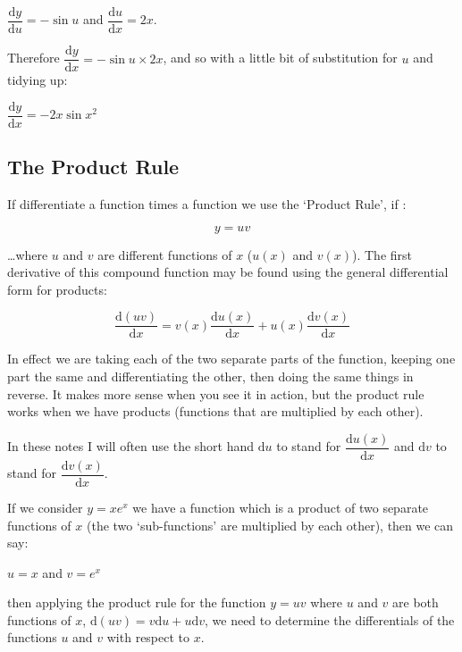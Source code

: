 \documentclass[
]{book}
\begin{document}
\(\dfrac{\textrm{d}y}{\textrm{d}u} = -\sin u\) and \(\dfrac{\textrm{d}u}{\textrm{d}x}=2x\).

Therefore \(\dfrac{\textrm{d}y}{\textrm{d}x} = -\sin u \times 2x\), and so with a little bit of substitution for \(u\) and tidying up:

\(\dfrac{\textrm{d}y}{\textrm{d}x} = -2x\sin x^2\)

\hypertarget{subsec:productrule}{%
\subsection{The Product Rule}\label{subsec:productrule}}

If differentiate a function times a function we use the `Product Rule', if :

\begin{equation*}
y= uv
\end{equation*}

\ldots where \(u\) and \(v\) are different functions of \(x\) (\(u(x)\) and \(v(x)\)). The first derivative of this compound function may be found using the general differential form for products:

\begin{equation}
\dfrac{\textrm{d}(uv)}{\textrm{d}x} = v(x)\dfrac{\textrm{d}u(x)}{\textrm{d}x} + u(x)\dfrac{\textrm{d}v(x)}{\textrm{d}x}
\label{eq:productrule}
\end{equation}

In effect we are taking each of the two separate parts of the function, keeping one part the same and differentiating the other, then doing the same things in reverse. It makes more sense when you see it in action, but the product rule works when we have products (functions that are multiplied by each other).

In these notes I will often use the short hand \(\textrm{d}u\) to stand for \(\dfrac{\textrm{d}u(x)}{\textrm{d}x}\) and \(\textrm{d}v\) to stand for \(\dfrac{\textrm{d}v(x)}{\textrm{d}x}\).

If we consider \(y=xe^x\) we have a function which is a product of two separate functions of \(x\) (the two `sub-functions' are multiplied by each other), then we can say:

\(u= x\) and \(v=e^x\)

then applying the product rule for the function \(y=uv\) where \(u\) and \(v\) are both functions of \(x\), \(\textrm{d}(uv) = v\textrm{d}u + u\textrm{d}v\), we need to determine the differentials of the functions \(u\) and \(v\) with respect to \(x\).
\end{document}
